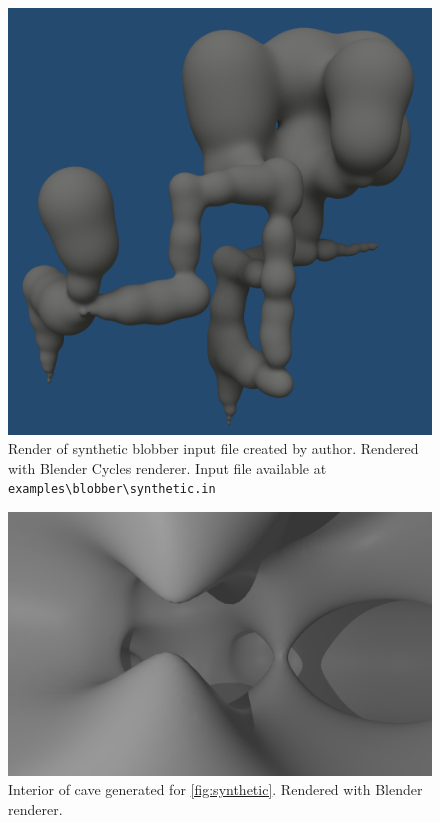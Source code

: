 \begin{figure}[htb]
  \begin{center}
    \includegraphics[width=\textwidth]{chapters/project/synthetic.png}
  \end{center}
  \caption{Render of synthetic blobber input file created by author. Rendered
    with Blender Cycles renderer. Input file available at \texttt{examples\textbackslash blobber\textbackslash synthetic.in}}
  \label{fig:synthetic}
\end{figure}

\begin{figure}[htb]
  \begin{center}
    \includegraphics[width=\textwidth]{chapters/project/interior.png}
  \end{center}
  \caption{Interior of cave generated for \autoref{fig:synthetic}. Rendered with
Blender renderer.}
  \label{fig:interior}
\end{figure}
